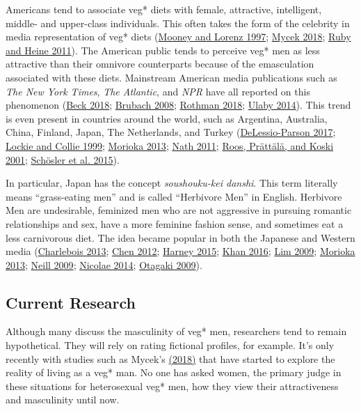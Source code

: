 \documentclass[twoside]{report}
\begin{document}
Americans tend to associate veg* diets with female, attractive,
intelligent, middle- and upper-class individuals. This often takes the form of the celebrity in media representation of veg* diets (\hyperlink{mooney}{Mooney and Lorenz 1997}; \hyperlink{mycek}{Mycek 2018}; \hyperlink{ruby}{Ruby and Heine 2011}). The American public tends to perceive veg* men as less attractive than their omnivore counterparts because of the emasculation associated with these diets. Mainstream American media publications such as \emph{The New York Times}, \emph{The Atlantic}, and \emph{NPR} have all reported on this phenomenon (\hyperlink{beck}{Beck 2018}; \hyperlink{brubach}{Brubach 2008}; \hyperlink{rothman}{Rothman 2018}; \hyperlink{ulaby}{Ulaby 2014}). This trend is even present in countries around the world, such as Argentina, Australia, China, Finland, Japan, The Netherlands, and Turkey (\hyperlink{delassio-parson}{DeLessio-Parson 2017}; \hyperlink{lockie}{Lockie and Collie 1999}; \hyperlink{morioka}{Morioka 2013}; \hyperlink{nath}{Nath 2011}; \hyperlink{roos}{Roos, Prättälä, and Koski 2001}; \hyperlink{schosler}{Schösler et al. 2015}).

In particular, Japan has the concept \emph{soushouku-kei danshi}. This term literally means ``grass-eating men'' and is called ``Herbivore Men'' in English. Herbivore Men are undesirable, feminized men who are not aggressive in pursuing romantic relationships and sex, have a more feminine fashion sense, and sometimes eat a less carnivorous diet. The idea became popular in both the Japanese and Western media (\hyperlink{charlebois}{Charlebois 2013}; \hyperlink{chen}{Chen 2012}; \hyperlink{harney}{Harney 2015}; \hyperlink{khan}{Khan 2016}; \hyperlink{lim}{Lim 2009}; \hyperlink{morioka}{Morioka 2013}; \hyperlink{neill}{Neill 2009}; \hyperlink{nicolae}{Nicolae 2014}; \hyperlink{otagaki}{Otagaki 2009}).

\subsection{Current Research}

Although many discuss the masculinity of veg* men, researchers tend to remain hypothetical. They will rely on rating fictional profiles, for example. It's only recently with studies such as Mycek's \hyperlink{mycek}{(2018)} that have started to explore the reality of living as a veg* man. No one has asked women, the primary judge in these situations for heterosexual veg* men, how they view their attractiveness and masculinity until now.
\end{document}
